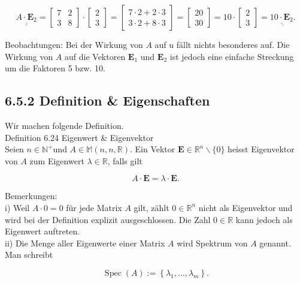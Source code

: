 \documentclass[10pt]{article}
\begin{document}
\[
\underline{\underline{A \cdot \mathbf{E}_{2}}}=\left[\begin{array}{ll}7 & 2  \tag{6.152}\\ 3 & 8\end{array}\right] \cdot\left[\begin{array}{l}2 \\ 3\end{array}\right]=\left[\begin{array}{l}7 \cdot 2+2 \cdot 3 \\ 3 \cdot 2+8 \cdot 3\end{array}\right]=\left[\begin{array}{l}20 \\ 30\end{array}\right]=10 \cdot\left[\begin{array}{l}2 \\ 3\end{array}\right]=\underline{\underline{10 \cdot \mathbf{E}_{2}} .}
\]

Beobachtungen: Bei der Wirkung von $A$ auf u fällt nichts besonderes auf. Die Wirkung von $A$ auf die Vektoren $\mathbf{E}_{1}$ und $\mathbf{E}_{2}$ ist jedoch eine einfache Streckung um die Faktoren 5 bzw. 10.

\subsection*{6.5.2 Definition \& Eigenschaften}
Wir machen folgende Definition.\\
Definition 6.24 Eigenwert \& Eigenvektor\\
Seien $n \in \mathbb{N}^{+}$und $A \in \mathbb{M}(n, n, \mathbb{R})$. Ein Vektor $\mathbf{E} \in \mathbb{R}^{n} \backslash\{0\}$ heisst Eigenvektor von $A$ zum Eigenwert $\lambda \in \mathbb{R}$, falls gilt


\begin{equation*}
A \cdot \mathbf{E}=\lambda \cdot \mathbf{E} . \tag{6.153}
\end{equation*}


Bemerkungen:\\
i) Weil $A \cdot 0=0$ für jede Matrix $A$ gilt, zählt $0 \in \mathbb{R}^{n}$ nicht als Eigenvektor und wird bei der Definition explizit ausgeschlossen. Die Zahl $0 \in \mathbb{R}$ kann jedoch als Eigenwert auftreten.\\
ii) Die Menge aller Eigenwerte einer Matrix $A$ wird Spektrum von $A$ genannt. Man schreibt


\begin{equation*}
\operatorname{Spec}(A):=\left\{\lambda_{1}, \ldots, \lambda_{m}\right\} . \tag{6.154}
\end{equation*}
\end{document}

